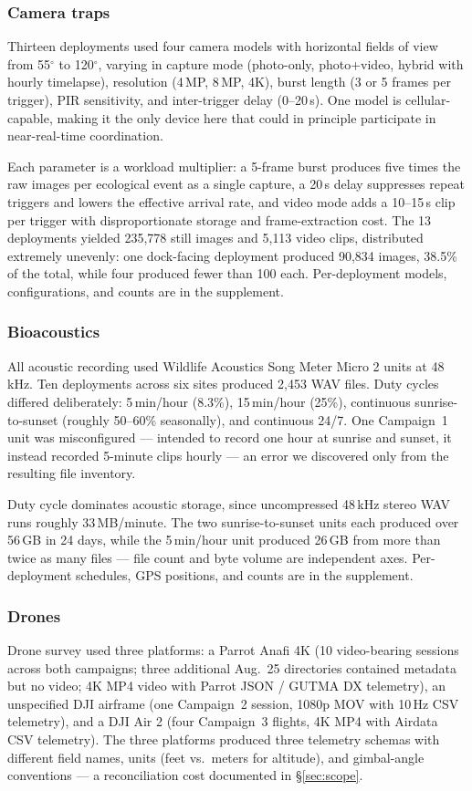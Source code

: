 \documentclass[sigconf]{acmart}
\begin{document}
\subsubsection{Camera traps}
Thirteen deployments used four camera models with horizontal fields of
view from 55$^\circ$ to 120$^\circ$, varying in capture mode (photo-only,
photo+video, hybrid with hourly timelapse), resolution (4\,MP, 8\,MP,
4K), burst length (3 or 5 frames per trigger), PIR sensitivity, and
inter-trigger delay (0--20\,s). One model is cellular-capable, making it
the only device here that could in principle participate in
near-real-time coordination.

Each parameter is a workload multiplier: a 5-frame burst produces five
times the raw images per ecological event as a single capture, a 20\,s
delay suppresses repeat triggers and lowers the effective arrival rate,
and video mode adds a 10--15\,s clip per trigger with disproportionate
storage and frame-extraction cost. The 13 deployments yielded
235{,}778 still images and 5{,}113 video clips, distributed extremely
unevenly: one dock-facing deployment produced 90{,}834 images, 38.5\% of
the total, while four produced fewer than 100 each. Per-deployment
models, configurations, and counts are in the supplement.



\subsubsection{Bioacoustics}
All acoustic recording used Wildlife Acoustics Song Meter Micro 2 units
at 48\,kHz. Ten deployments across six sites produced 2{,}453 WAV files.
Duty cycles differed deliberately: 5\,min/hour (8.3\%), 15\,min/hour
(25\%), continuous sunrise-to-sunset (roughly 50--60\% seasonally), and
continuous 24/7. One Campaign~1 unit was misconfigured --- intended to
record one hour at sunrise and sunset, it instead recorded 5-minute
clips hourly --- an error we discovered only from the resulting file
inventory.

Duty cycle dominates acoustic storage, since uncompressed 48\,kHz stereo
WAV runs roughly 33\,MB/minute. The two sunrise-to-sunset units each
produced over 56\,GB in 24 days, while the 5\,min/hour unit produced
26\,GB from more than twice as many files --- file count and byte volume
are independent axes. Per-deployment schedules, GPS positions, and
counts are in the supplement.



\subsubsection{Drones}
Drone survey used three platforms: a Parrot Anafi 4K (10 video-bearing
sessions across both campaigns; three additional Aug.~25 directories contained
metadata but no video; 4K MP4 video with Parrot JSON / GUTMA DX telemetry),
an unspecified DJI airframe (one Campaign~2 session,
1080p MOV with 10\,Hz CSV telemetry), and a DJI Air 2 (four Campaign~3
flights, 4K MP4 with Airdata CSV telemetry). The three platforms
produced three telemetry schemas with different field names, units
(feet vs.\ meters for altitude), and gimbal-angle conventions ---
a reconciliation cost documented in \S\ref{sec:scope}.
\end{document}
